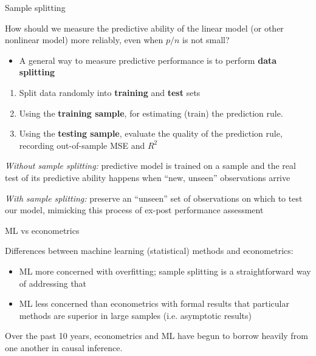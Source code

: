 \documentclass[compress, 8pt]{beamer}
\begin{document}
\begin{frame}{Sample splitting}

    How should we measure the predictive ability of the linear model (or other nonlinear model) more reliably, even when $p/n$ is not small?

    \vspace{2ex}
    \begin{itemize}
        \item [$\implies$] A general way to measure predictive performance is to perform \textbf{data splitting}
    \end{itemize}

\begin{enumerate}
    \item Split data randomly into \textbf{training} and \textbf{test} sets

    \item Using the \textbf{training sample}, for estimating (train) the prediction rule.

    \item Using the \textbf{testing sample}, evaluate the quality of the prediction rule, recording out-of-sample MSE and $R^2$
\end{enumerate}

\vspace{2ex}
\emph{Without sample splitting:} predictive model is trained on a sample and the real test of its predictive ability happens when ``new, unseen'' observations arrive

\vspace{2ex}
\emph{With sample splitting: } preserve an ``unseen'' set of observations on which to test our model, mimicking this process of ex-post performance assessment


\end{frame}


\begin{frame}{ML vs econometrics}

    Differences between machine learning (statistical) methods and econometrics:
    \begin{itemize}
        \item ML more concerned with overfitting; sample splitting is a straightforward way of addressing that
        \item ML less concerned than econometrics with formal results that particular methods are superior in large samples (i.e. asymptotic results)
    \end{itemize}
    Over the past 10 years, econometrics and ML have begun to borrow heavily from one another in causal inference.

    \vspace{2ex}

\end{frame}
\end{document}
